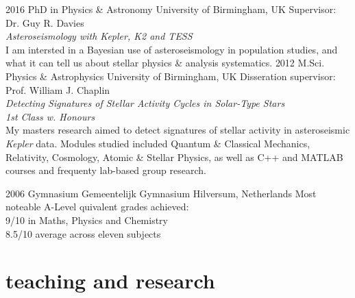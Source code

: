 \documentclass[]{k-cv} %
\begin{document}
\begin{entrylist}
\entry
{2016 }
{PhD {\normalfont in Physics \& Astronomy}}
{University of Birmingham, UK}
{Supervisor: Dr. Guy R. Davies\\
\emph{Asteroseismology with \textit{Kepler}, K2 and TESS} \vspace{0.2cm}\\
I am intersted in a Bayesian use of asteroseismology in population studies, and what it can tell us about stellar physics \& analysis systematics.}
\entry
{2012 }
{M.Sci. {\normalfont Physics \& Astrophysics}}
{University of Birmingham, UK}
{Disseration supervisor: Prof. William J. Chaplin\\
\emph{Detecting Signatures of Stellar Activity Cycles in Solar-Type Stars} \\ 
\emph{1st Class w. Honours}\vspace{0.2cm}\\
My masters research aimed to detect signatures of stellar activity in asteroseismic \textit{Kepler} data. Modules studied included Quantum \& Classical Mechanics, Relativity, Cosmology, Atomic \& Stellar Physics, as well as C++ and MATLAB courses and frequenty lab-based group research.}


\entry
{2006 }
{Gymnasium}
{Gemeentelijk Gymnasium Hilversum, Netherlands}
{Most noteable A-Level quivalent grades achieved:\\
9/10 in Maths, Physics and Chemistry\\
8.5/10 average across eleven subjects}
\end{entrylist}


\section{teaching and research}
\end{document}

